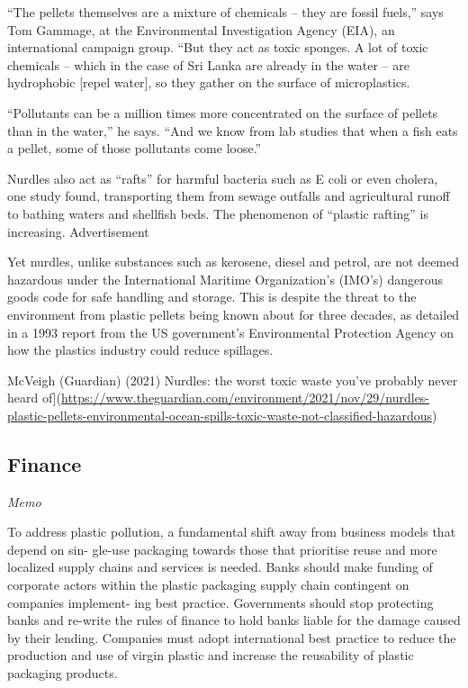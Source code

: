 \documentclass[
]{book}
\begin{document}
``The pellets themselves are a mixture of chemicals -- they are fossil fuels,'' says Tom Gammage, at the Environmental Investigation Agency (EIA), an international campaign group. ``But they act as toxic sponges. A lot of toxic chemicals -- which in the case of Sri Lanka are already in the water -- are hydrophobic {[}repel water{]}, so they gather on the surface of microplastics.

``Pollutants can be a million times more concentrated on the surface of pellets than in the water,'' he says. ``And we know from lab studies that when a fish eats a pellet, some of those pollutants come loose.''

Nurdles also act as ``rafts'' for harmful bacteria such as E coli or even cholera, one study found, transporting them from sewage outfalls and agricultural runoff to bathing waters and shellfish beds. The phenomenon of ``plastic rafting'' is increasing.
Advertisement

Yet nurdles, unlike substances such as kerosene, diesel and petrol, are not deemed hazardous under the International Maritime Organization's (IMO's) dangerous goods code for safe handling and storage. This is despite the threat to the environment from plastic pellets being known about for three decades, as detailed in a 1993 report from the US government's Environmental Protection Agency on how the plastics industry could reduce spillages.

McVeigh (Guardian) (2021) Nurdles: the worst toxic waste you've probably never heard of{]}(\url{https://www.theguardian.com/environment/2021/nov/29/nurdles-plastic-pellets-environmental-ocean-spills-toxic-waste-not-classified-hazardous})

\hypertarget{finance}{%
\subsection{Finance}\label{finance}}

\emph{Memo}

To address plastic pollution, a fundamental shift
away from business models that depend on sin-
gle-use packaging towards those that prioritise
reuse and more localized supply chains and services
is needed.
Banks should make funding of corporate
actors within the plastic packaging supply
chain contingent on companies implement-
ing best practice.
Governments should stop protecting banks
and re-write the rules of finance to hold
banks liable for the damage caused by their
lending.
Companies must adopt international best
practice to reduce the production and use
of virgin plastic and increase the reusability
of plastic packaging products.
\end{document}
